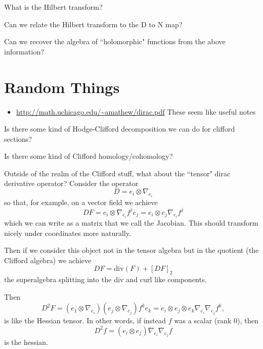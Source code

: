 \begin{question}
What is the Hilbert transform?
\end{question}

\begin{question}
Can we relate the Hilbert transform to the D to N map?
\end{question}

\begin{question}
Can we recover the algebra of ``holomorphic" functions from the above information?
\end{question}

\section*{Random Things}


\begin{itemize}
    \item \url{http://math.uchicago.edu/~amathew/dirac.pdf} These seem like useful notes
\end{itemize}

\begin{question}
    Is there some kind of Hodge-Clifford decomposition we can do for clifford sections?
\end{question}

\begin{question}
Is there some kind of Clifford homology/cohomology?
\end{question}

Outside of the realm of the Clifford stuff, what about the ``tensor" dirac derivative operator?  Consider the operator
\[
D = e_i \otimes \nabla_{e_i}
\]
so that, for example, on a vector field we achieve
\[
DF = e_i \otimes \nabla_{e_i}f^j e_j = e_i \otimes e_j \nabla_{e_i} f^j
\]
which we can write as a matrix that we call the Jacobian. This should transform nicely under coordinates more naturally.

Then if we consider this object not in the tensor algebra but in the quotient (the Clifford algebra) we achieve
\[
DF = \textrm{div}(F) + [DF]_2
\]
the superalgebra splitting into the div and curl like components.

Then
\[
D^2F = (e_1 \otimes \nabla_{e_i})(e_j\otimes \nabla_{e_j})f^ke_{k} = e_i \otimes e_j \otimes e_k \nabla_{e_i} \nabla_{e_j} f^k,
\]
is like the Hessian tensor. In other words, if instead $f$ was a scalar (rank 0), then
\[
D^2f = (e_i \otimes e_j) \nabla_{e_i} \nabla_{e_j} f
\]
is the hessian.




